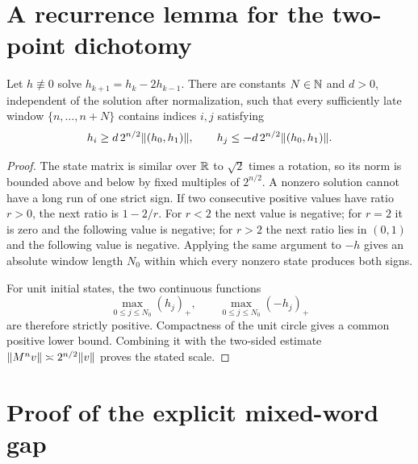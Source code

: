 \documentclass[letterpaper,twoside]{article}
\begin{document}
\section{A recurrence lemma for the two-point dichotomy}\label{sec:appendix}

\begin{lemma}\label{lem:window-signs}
Let $h\not\equiv0$ solve $h_{k+1}=h_k-2h_{k-1}$.  There are constants
$N\in\mathbb N$ and $d>0$, independent of the solution after normalization, such
that every sufficiently late window $\{n,\ldots,n+N\}$ contains indices
$i,j$ satisfying
\[
 h_i\ge d\,2^{n/2}\lVert (h_0,h_1)\rVert,
 \qquad
 h_j\le-d\,2^{n/2}\lVert (h_0,h_1)\rVert.
\]
\end{lemma}

\begin{proof}
The state matrix is similar over $\mathbb R$ to $\sqrt2$ times a rotation, so its
norm is bounded above and below by fixed multiples of $2^{n/2}$.  A nonzero
solution cannot have a long run of one strict sign.  If two consecutive
positive values have ratio $r>0$, the next ratio is $1-2/r$.  For $r<2$ the
next value is negative; for $r=2$ it is zero and the following value is
negative; for $r>2$ the next ratio lies in $(0,1)$ and the following value is
negative.  Applying the same argument to $-h$ gives an absolute window length
$N_0$ within which every nonzero state produces both signs.

For unit initial states, the two continuous functions
\[
 \max_{0\le j\le N_0}(h_j)_+,
 \qquad
 \max_{0\le j\le N_0}(-h_j)_+
\]
are therefore strictly positive.  Compactness of the unit circle gives a
common positive lower bound.  Combining it with the two-sided estimate
$\lVert M^nv\rVert\asymp2^{n/2}\lVert v\rVert$ proves the stated scale.
\end{proof}

\section{Proof of the explicit mixed-word gap}
\label{sec:quantitative-gap-proof}
\end{document}
